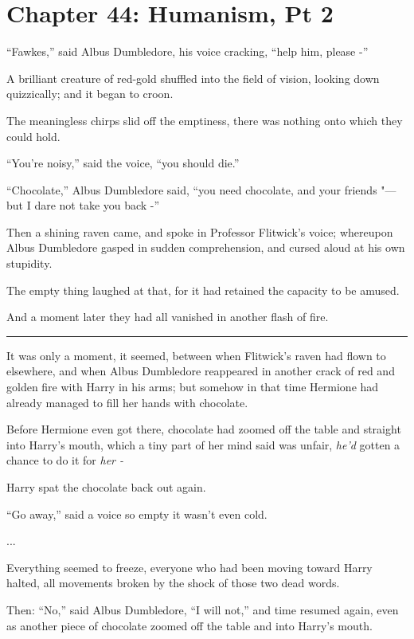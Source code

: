 \chapter{Chapter 44: Humanism, Pt 2}
``Fawkes,'' said Albus Dumbledore, his voice cracking, ``help him,
please -''

A brilliant creature of red-gold shuffled into the field of vision,
looking down quizzically; and it began to croon.

The meaningless chirps slid off the emptiness, there was nothing onto
which they could hold.

``You're noisy,'' said the voice, ``you should die.''

``Chocolate,'' Albus Dumbledore said, ``you need chocolate, and your
friends "--- but I dare not take you back -''

Then a shining raven came, and spoke in Professor Flitwick's voice;
whereupon Albus Dumbledore gasped in sudden comprehension, and cursed
aloud at his own stupidity.

The empty thing laughed at that, for it had retained the capacity to be
amused.

And a moment later they had all vanished in another flash of fire.

\begin{center}\rule{3in}{0.4pt}\end{center}

It was only a moment, it seemed, between when Flitwick's raven had flown
to elsewhere, and when Albus Dumbledore reappeared in another crack of
red and golden fire with Harry in his arms; but somehow in that time
Hermione had already managed to fill her hands with chocolate.

Before Hermione even got there, chocolate had zoomed off the table and
straight into Harry's mouth, which a tiny part of her mind said was
unfair, \emph{he'd} gotten a chance to do it for \emph{her -}

Harry spat the chocolate back out again.

``Go away,'' said a voice so empty it wasn't even cold.

...

Everything seemed to freeze, everyone who had been moving toward Harry
halted, all movements broken by the shock of those two dead words.

Then: ``No,'' said Albus Dumbledore, ``I will not,'' and time resumed
again, even as another piece of chocolate zoomed off the table and into
Harry's mouth.

